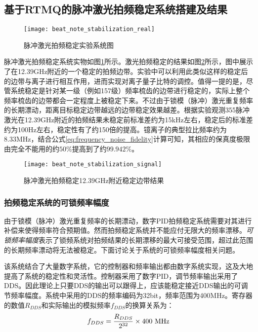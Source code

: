 \subsection[基于RTMQ的脉冲激光拍频稳定系统搭建及结果]{基于RTMQ的脉冲激光拍频稳定系统搭建及结果}


\begin{figure}
    \centering
    \caption[脉冲激光拍频稳定实验系统图]{脉冲激光拍频稳定实验系统图\label{fig:beat_note_stabilization_real}}
    \texttt{[image: beat\_note\_stabilization\_real]}
\end{figure}

脉冲激光拍频稳定系统实物如图\ref{fig:beat_note_stabilization_real}所示。激光拍频稳定的结果如图\ref{fig:beat_note_stabilization_signal}所示，图中展示了在12.39GHz附近的一个稳定的拍频边带。实验中可以利用此类似这样的稳定后的边带与离子进行相互作用，进而实现对离子量子比特的调控。值得一提的是，尽管系统稳定是针对某一级（例如157级）频率梳齿的边带进行稳定的，实际上整个频率梳齿的边带都会一定程度上被稳定下来。不过由于锁模（脉冲）激光重复频率的长期漂动，距离目标稳定边带越远的边带稳定效果越差。根据实验观测355脉冲激光在12.39GHz附近的拍频结果未稳定前标准差约为15kHz左右，稳定后的标准差约为100Hz左右，稳定性有了约150倍的提高。镱离子的典型拉比频率约为8.33MHz，结合公式\eqref{eq:frequency_noise_fidelity}计算可知，其相应的保真度极限由完全不能用的约$50\%$提高到了约$99.942\%$。

\begin{figure}
    \centering
    \caption[脉冲激光拍频稳定12.39GHz附近稳定边带结果]{脉冲激光拍频稳定12.39GHz附近稳定边带结果\label{fig:beat_note_stabilization_signal}}
    \texttt{[image: beat\_note\_stabilization\_signal]}
\end{figure}

\subsubsection[拍频稳定系统的可锁频率幅度]{拍频稳定系统的可锁频率幅度}
由于锁模（脉冲）激光重复频率的长期漂动，数字PID拍频稳定系统需要对其进行补偿来使得频率符合预期值。然而拍频稳定系统并不能应付无限大的频率漂移。\emph{可锁频率幅度}表示了锁频系统对拍频结果的长期漂移的最大可接受范围，超过此范围的长期频率漂动将无法被稳定。下面讨论关于系统的可锁频率幅度相关问题。

该系统结合了大量数字系统，它的控制器和频率输出都由数字系统实现，这及大地提高了系统的稳定性和灵活性。控制器采用了数字PID，调节频率输出采用了DDS。因此理论上只要DDS的输出可以跟得上，应该能稳定接近DDS输出的可调节频率幅度。系统中采用的DDS的频率编码为32bit，频率范围为400MHz。寄存器的数值$R_{DDS}$和实际输出的模拟频率$f_{DDS}$的换算关系为：
\begin{align}
    f_{DDS}=\frac{R_{DDS}}{2^{32}}\times 400\ \textnormal{MHz}
\end{align}

